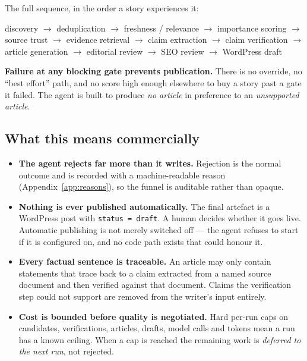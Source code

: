 \documentclass[11pt,a4paper]{article}
\newcommand{\brk}{\hyphenpenalty=0\exhyphenpenalty=0\relax}
\newcommand{\code}[1]{\texttt{\small\brk #1}}
\begin{document}
\vspace{0.4em}
The full sequence, in the order a story experiences it:

\begin{center}
\small
discovery $\rightarrow$ deduplication $\rightarrow$ freshness / relevance $\rightarrow$
importance scoring $\rightarrow$ source trust $\rightarrow$ evidence retrieval $\rightarrow$
claim extraction $\rightarrow$ claim verification $\rightarrow$ article generation $\rightarrow$
editorial review $\rightarrow$ SEO review $\rightarrow$ WordPress draft
\end{center}

\begin{blockbox}
\textbf{Failure at any blocking gate prevents publication.} There is no
override, no ``best effort'' path, and no score high enough elsewhere to buy a
story past a gate it failed. The agent is built to produce \emph{no article} in
preference to an \emph{unsupported article}.
\end{blockbox}

\subsection{What this means commercially}

\begin{itemize}[leftmargin=1.2em,itemsep=0.25em]
  \item \textbf{The agent rejects far more than it writes.} Rejection is the
    normal outcome and is recorded with a machine-readable reason
    (Appendix~\ref{app:reasons}), so the funnel is auditable rather than opaque.
  \item \textbf{Nothing is ever published automatically.} The final artefact is a
    WordPress post with \code{status = draft}. A human decides whether it goes
    live. Automatic publishing is not merely switched off --- the agent refuses to
    start if it is configured on, and no code path exists that could honour it.
  \item \textbf{Every factual sentence is traceable.} An article may only contain
    statements that trace back to a claim extracted from a named source document
    and then verified against that document. Claims the verification step could
    not support are removed from the writer's input entirely.
  \item \textbf{Cost is bounded before quality is negotiated.} Hard per-run caps
    on candidates, verifications, articles, drafts, model calls and tokens mean a
    run has a known ceiling. When a cap is reached the remaining work is
    \emph{deferred to the next run}, not rejected.
\end{itemize}
\end{document}
